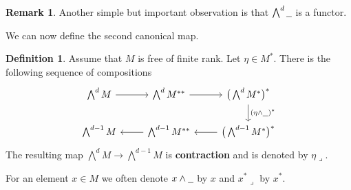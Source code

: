 \documentclass[12pt]{article}
\theoremstyle{plain}
\theoremstyle{definition}
\newtheorem{defn}[thm]{Definition} %
\newtheorem{remark}[thm]{Remark}
\newcommand{\und}[1]{\underline{\hspace{#1 cm}}}
\newcommand{\lto}{\longrightarrow}
\begin{document}
	\begin{remark}
		Another simple but important observation is that $\bigwedge^d \und{0.2}$ is a functor.
	\end{remark}
	We can now define the second canonical map.
	\begin{defn}
		Assume that $M$ is free of finite rank. Let $\eta \in M^\ast$. There is the following sequence of compositions
		\begin{equation}\label{eq:contraction}
			\begin{tikzcd}
				{\bigwedge^d M}\arrow[r] & {\bigwedge^d M^{\ast\ast}}\arrow[r] & {\big(\bigwedge^d M^\ast\big)^\ast}\arrow[d,"{(\eta \wedge \und{0.2})^\ast}"]\\
				{\bigwedge^{d-1} M} & {\bigwedge^{d-1}M^{\ast\ast}}\arrow[l]& {\big(\bigwedge^{d-1} M^\ast\big)^{\ast}}\arrow[l]
			\end{tikzcd}
		\end{equation}
		The resulting map $\bigwedge^d M \lto \bigwedge^{d-1}M$ is \textbf{contraction} and is denoted by $\eta \lrcorner$.
		
		For an element $x \in M$ we often denote $x \wedge \und{0.2}$ by $x$ and $x^\ast \lrcorner$ by $x^\ast$.
	\end{defn}
\end{document}

